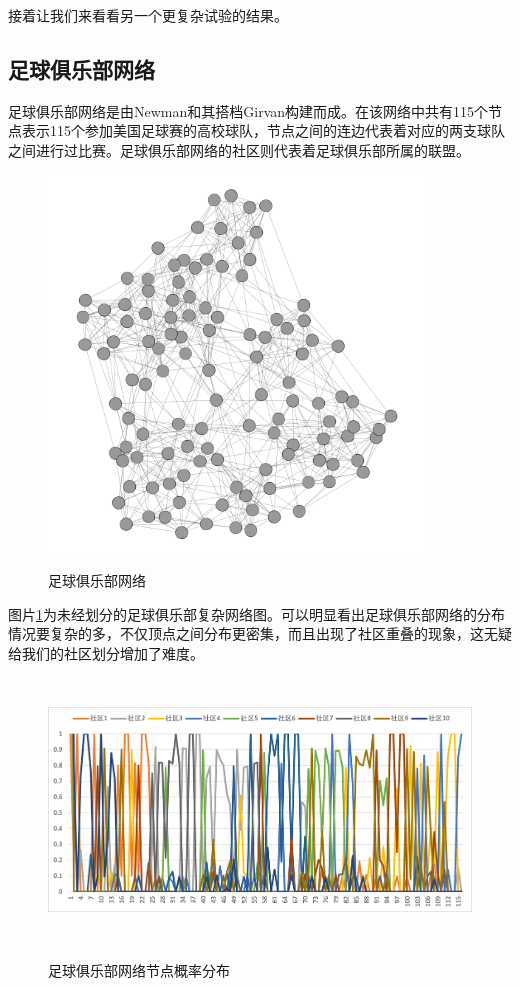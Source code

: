\documentclass[a4paper,12pt,openany,oneside,utf-8]{ctexbook}
\begin{document}
    接着让我们来看看另一个更复杂试验的结果。
	\subsection{足球俱乐部网络}
	
	足球俱乐部网络是由Newman和其搭档Girvan构建而成。在该网络中共有115个节点表示115个参加美国足球赛的高校球队，节点之间的连边代表着对应的两支球队之间进行过比赛。足球俱乐部网络的社区则代表着足球俱乐部所属的联盟。
	
		
	\begin{figure}[H]
	\centering
	\includegraphics[width=100mm,height=100mm]{figure/football-ori.png}\\
	\caption{足球俱乐部网络}\label{f10}
    \end{figure}
	
	图片\ref{f10}为未经划分的足球俱乐部复杂网络图。可以明显看出足球俱乐部网络的分布情况要复杂的多，不仅顶点之间分布更密集，而且出现了社区重叠的现象，这无疑给我们的社区划分增加了难度。
	
	\begin{figure}[H]
	\centering
	\includegraphics[width=160mm,height=70mm]{figure/football-pro.png}\\
	\caption{足球俱乐部网络节点概率分布}\label{f11}
    \end{figure}
	
\end{document}
